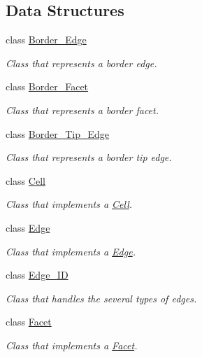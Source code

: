\subsection*{Data Structures}
\begin{DoxyCompactItemize}
\item 
class \hyperlink{classFVCode3D_1_1Rigid__Mesh_1_1Border__Edge}{Border\+\_\+\+Edge}
\begin{DoxyCompactList}\small\item\em Class that represents a border edge. \end{DoxyCompactList}\item 
class \hyperlink{classFVCode3D_1_1Rigid__Mesh_1_1Border__Facet}{Border\+\_\+\+Facet}
\begin{DoxyCompactList}\small\item\em Class that represents a border facet. \end{DoxyCompactList}\item 
class \hyperlink{classFVCode3D_1_1Rigid__Mesh_1_1Border__Tip__Edge}{Border\+\_\+\+Tip\+\_\+\+Edge}
\begin{DoxyCompactList}\small\item\em Class that represents a border tip edge. \end{DoxyCompactList}\item 
class \hyperlink{classFVCode3D_1_1Rigid__Mesh_1_1Cell}{Cell}
\begin{DoxyCompactList}\small\item\em Class that implements a \hyperlink{classFVCode3D_1_1Rigid__Mesh_1_1Cell}{Cell}. \end{DoxyCompactList}\item 
class \hyperlink{classFVCode3D_1_1Rigid__Mesh_1_1Edge}{Edge}
\begin{DoxyCompactList}\small\item\em Class that implements a \hyperlink{classFVCode3D_1_1Rigid__Mesh_1_1Edge}{Edge}. \end{DoxyCompactList}\item 
class \hyperlink{classFVCode3D_1_1Rigid__Mesh_1_1Edge__ID}{Edge\+\_\+\+ID}
\begin{DoxyCompactList}\small\item\em Class that handles the several types of edges. \end{DoxyCompactList}\item 
class \hyperlink{classFVCode3D_1_1Rigid__Mesh_1_1Facet}{Facet}
\begin{DoxyCompactList}\small\item\em Class that implements a \hyperlink{classFVCode3D_1_1Rigid__Mesh_1_1Facet}{Facet}. \end{DoxyCompactList}\item 

\end{DoxyCompactItemize}
